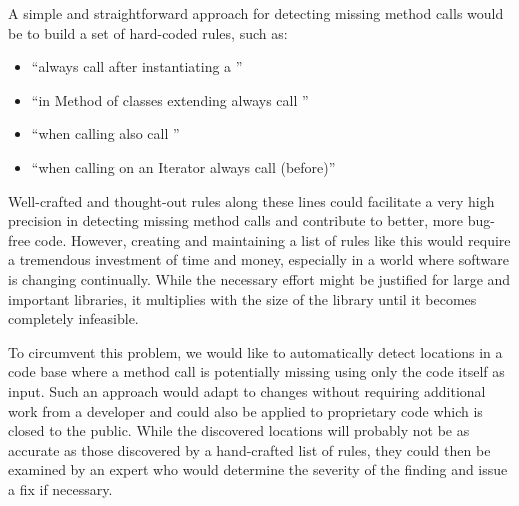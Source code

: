A simple and straightforward approach for detecting missing method calls would be to build a set of hard-coded rules, such as:
\begin{itemize}
    \item ``always call  after instantiating a ''
    \item ``in Method  of classes extending  always call ''
    \item ``when calling  also call ''
    \item ``when calling  on an Iterator always call  (before)''
\end{itemize}
Well-crafted and thought-out rules along these lines could facilitate a very high precision in detecting missing method calls and contribute to better, more bug-free code.
However, creating and maintaining a list of rules like this would require a tremendous investment of time and money, especially in a world where software is changing continually.
While the necessary effort might be justified for large and important libraries, it multiplies with the size of the library until it becomes completely infeasible.

To circumvent this problem, we would like to automatically detect locations in a code base where a method call is potentially missing using only the code itself as input.
Such an approach would adapt to changes without requiring additional work from a developer and could also be applied to proprietary code which is closed to the public.
While the discovered locations will probably not be as accurate as those discovered by a hand-crafted list of rules, they could then be examined by an expert who would determine the severity of the finding and issue a fix if necessary.



